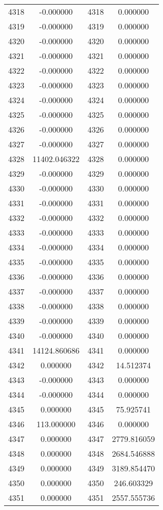\documentclass[12pt]{article}
\begin{document}
\begin{longtable}{@{}cccc@{}}
4318 & -0.000000 & 4318 & 0.000000 \\
4319 & -0.000000 & 4319 & 0.000000 \\
4320 & -0.000000 & 4320 & 0.000000 \\
4321 & -0.000000 & 4321 & 0.000000 \\
4322 & -0.000000 & 4322 & 0.000000 \\
4323 & -0.000000 & 4323 & 0.000000 \\
4324 & -0.000000 & 4324 & 0.000000 \\
4325 & -0.000000 & 4325 & 0.000000 \\
4326 & -0.000000 & 4326 & 0.000000 \\
4327 & -0.000000 & 4327 & 0.000000 \\
4328 & 11402.046322 & 4328 & 0.000000 \\
4329 & -0.000000 & 4329 & 0.000000 \\
4330 & -0.000000 & 4330 & 0.000000 \\
4331 & -0.000000 & 4331 & 0.000000 \\
4332 & -0.000000 & 4332 & 0.000000 \\
4333 & -0.000000 & 4333 & 0.000000 \\
4334 & -0.000000 & 4334 & 0.000000 \\
4335 & -0.000000 & 4335 & 0.000000 \\
4336 & -0.000000 & 4336 & 0.000000 \\
4337 & -0.000000 & 4337 & 0.000000 \\
4338 & -0.000000 & 4338 & 0.000000 \\
4339 & -0.000000 & 4339 & 0.000000 \\
4340 & -0.000000 & 4340 & 0.000000 \\
4341 & 14124.860686 & 4341 & 0.000000 \\
4342 & 0.000000 & 4342 & 14.512374 \\
4343 & -0.000000 & 4343 & 0.000000 \\
4344 & -0.000000 & 4344 & 0.000000 \\
4345 & 0.000000 & 4345 & 75.925741 \\
4346 & 113.000000 & 4346 & 0.000000 \\
4347 & 0.000000 & 4347 & 2779.816059 \\
4348 & 0.000000 & 4348 & 2684.546888 \\
4349 & 0.000000 & 4349 & 3189.854470 \\
4350 & 0.000000 & 4350 & 246.603329 \\
4351 & 0.000000 & 4351 & 2557.555736 \\

\end{longtable}
\end{document}
